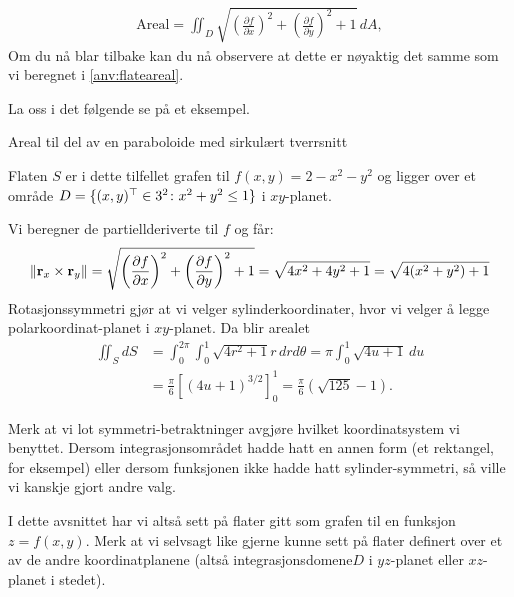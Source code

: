 \begin{align}\label{old_area_formel}
\textrm{Areal}= \iint_D \sqrt{ \left( \frac{\partial f}{\partial x} \right)^2 + \left( \frac{\partial f}{\partial y} \right)^2 + 1 }\, dA,
\end{align}
Om du nå blar tilbake kan du nå observere at dette er nøyaktig det samme som vi beregnet i \eqref{anv:flateareal}.

La oss i det følgende se på et eksempel.
\begin{eks}{Areal til del av en paraboloide med sirkulært tverrsnitt}\mbox{}\\
\begin{minipage}{7cm}
Flaten \( S \) er i dette tilfellet grafen til $f(x,y)=2-x^2-y^2$ og ligger over et område \( D = \{(x,y)^\top\in 3^2 \colon x^2+y^2 \leq 1\}\) i \( xy \)-planet. 
\end{minipage}
\begin{minipage}{5cm}
\end{minipage}

Vi beregner de partiellderiverte til $f$ og får:
\[
\left\| \mathbf{r}_x \times \mathbf{r}_y \right\| = \sqrt{ \left( \frac{\partial f}{\partial x} \right)^2 + \left( \frac{\partial f}{\partial y} \right)^2 + 1 }=\sqrt{4x^2+4y^2+1}=\sqrt{4(x^2+y^2)+1}
\]
Rotasjonssymmetri gjør at vi velger sylinderkoordinater, hvor vi velger å legge polarkoordinat-planet i $xy$-planet. Da blir arealet
\begin{align*}
\iint_S dS &=\int_0^{2\pi}\int_{0}^1 \sqrt{4r^2+1}r\, drd\theta = \pi \int_0^1\sqrt{4u+1}\, du\\ &= \frac{\pi}{6} [(4u+1)^{3/2}]_0^1 =\frac{\pi}{6}(\sqrt{125}-1).
\end{align*}
\end{eks}
Merk at vi lot symmetri-betraktninger avgjøre hvilket koordinatsystem vi benyttet. Dersom integrasjonsområdet hadde hatt en annen form (et rektangel, for eksempel) eller dersom funksjonen ikke hadde hatt sylinder-symmetri, så ville vi kanskje gjort andre valg. 

I dette avsnittet har vi altså sett på flater gitt som grafen til en funksjon $z=f(x,y).$ Merk at vi selvsagt like gjerne kunne sett på flater definert over et av de andre koordinatplanene (altså integrasjonsdomene\( D \) i \( yz \)-planet eller \( xz \)-planet i stedet). 


\FloatBarrier